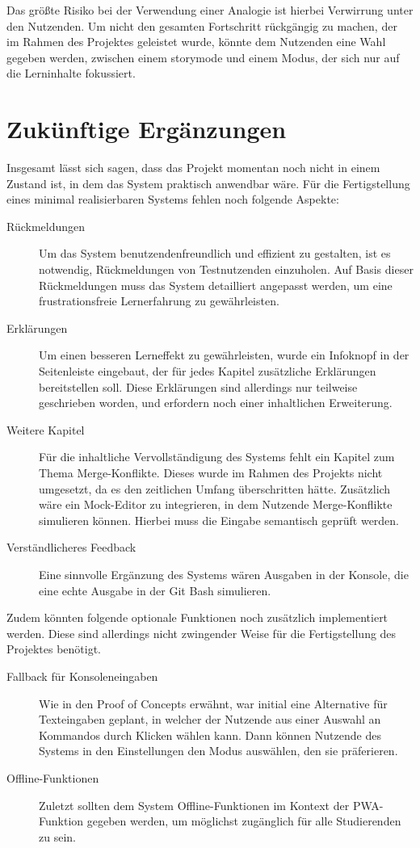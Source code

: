 Das größte Risiko bei der Verwendung einer Analogie ist hierbei Verwirrung unter den Nutzenden. 
Um nicht den gesamten Fortschritt rückgängig zu machen, der im Rahmen des Projektes geleistet wurde, könnte dem Nutzenden eine Wahl gegeben werden, zwischen einem \gls{storymode} und einem Modus, der sich nur auf die Lerninhalte fokussiert.

\section{Zukünftige Ergänzungen}
Insgesamt lässt sich sagen, dass das Projekt momentan noch nicht in einem Zustand ist, in dem das System praktisch anwendbar wäre.
Für die Fertigstellung eines minimal realisierbaren Systems fehlen noch folgende Aspekte:

\begin{description}
    \item[Rückmeldungen] Um das System benutzendenfreundlich und effizient zu gestalten, ist es notwendig, Rückmeldungen von Testnutzenden einzuholen. Auf Basis dieser Rückmeldungen muss das System detailliert angepasst werden, um eine frustrationsfreie Lernerfahrung zu gewährleisten.
    \item[Erklärungen] Um einen besseren Lerneffekt zu gewährleisten, wurde ein Infoknopf in der Seitenleiste eingebaut, der für jedes Kapitel zusätzliche Erklärungen bereitstellen soll. Diese Erklärungen sind allerdings nur teilweise geschrieben worden, und erfordern noch einer inhaltlichen Erweiterung.
    \item[Weitere Kapitel] Für die inhaltliche Vervollständigung des Systems fehlt ein Kapitel zum Thema Merge-Konflikte. Dieses wurde im Rahmen des Projekts nicht umgesetzt, da es den zeitlichen Umfang überschritten hätte. Zusätzlich wäre ein Mock-Editor zu integrieren, in dem Nutzende Merge-Konflikte simulieren können. Hierbei muss die Eingabe semantisch geprüft werden.
    \item[Verständlicheres Feedback] Eine sinnvolle Ergänzung des Systems wären Ausgaben in der Konsole, die eine echte Ausgabe in der Git Bash simulieren.
\end{description}

Zudem könnten folgende optionale Funktionen noch zusätzlich implementiert werden. Diese sind allerdings nicht zwingender Weise für die Fertigstellung des Projektes benötigt.

\begin{description}
    \item[Fallback für Konsoleneingaben] Wie in den Proof of Concepts erwähnt, war initial eine Alternative für Texteingaben geplant, in welcher der Nutzende aus einer Auswahl an Kommandos durch Klicken wählen kann. Dann können Nutzende des Systems in den Einstellungen den Modus auswählen, den sie präferieren.
    \item[Offline-Funktionen] Zuletzt sollten dem System Offline-Funktionen im Kontext der PWA-Funktion gegeben werden, um möglichst zugänglich für alle Studierenden zu sein. 
\end{description}
